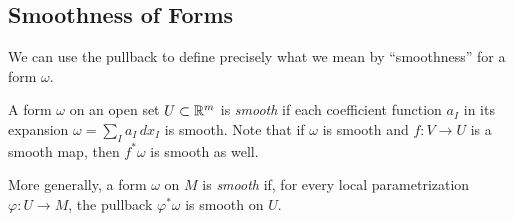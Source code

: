 \subsection{Smoothness of Forms}

We can use the pullback to define precisely what we mean by ``smoothness'' for a form $\omega$.

A form $\omega$ on an open set $U \subset \mathbb{R}^m$ is \emph{smooth} if each coefficient function $a_I$ in its expansion $\omega = \sum_I a_I\, dx_I$ is smooth. Note that if $\omega$ is smooth and $f \colon V \to U$ is a smooth map, then $f^*\omega$ is smooth as well.

More generally, a form $\omega$ on $M$ is \emph{smooth} if, for every local parametrization $\varphi \colon U \to M$, the pullback $\varphi^*\omega$ is smooth on $U$.
